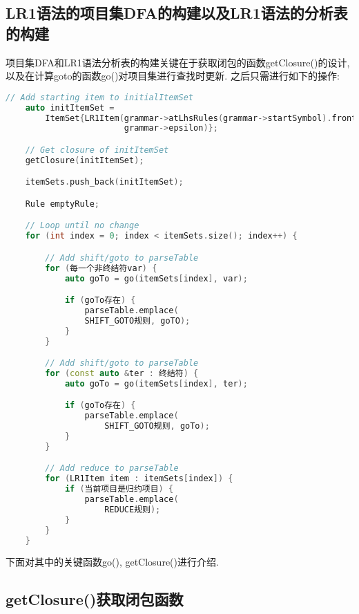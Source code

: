 \subsection{LR1语法的项目集DFA的构建以及LR1语法的分析表的构建}
项目集DFA和LR1语法分析表的构建关键在于获取闭包的函数getClosure()的设计,
以及在计算goto的函数go()对项目集进行查找时更新. 之后只需进行如下的操作:
\begin{lstlisting}[language=c++]
    // Add starting item to initialItemSet
    auto initItemSet =
        ItemSet{LR1Item(grammar->atLhsRules(grammar->startSymbol).front(), 0,
                        grammar->epsilon)};

    // Get closure of initItemSet
    getClosure(initItemSet);

    itemSets.push_back(initItemSet);

    Rule emptyRule;

    // Loop until no change
    for (int index = 0; index < itemSets.size(); index++) {

        // Add shift/goto to parseTable
        for (每一个非终结符var) {
            auto goTo = go(itemSets[index], var);

            if (goTo存在) {
                parseTable.emplace(
                SHIFT_GOTO规则, goTO);
            }
        }

        // Add shift/goto to parseTable
        for (const auto &ter : 终结符) {
            auto goTo = go(itemSets[index], ter);

            if (goTo存在) {
                parseTable.emplace(
                    SHIFT_GOTO规则, goTo);
            }
        }

        // Add reduce to parseTable
        for (LR1Item item : itemSets[index]) {
            if (当前项目是归约项目) {
                parseTable.emplace(
                    REDUCE规则);
            }
        }
    }
\end{lstlisting}

下面对其中的关键函数go(), getClosure()进行介绍.
\subsection{getClosure()获取闭包函数}

